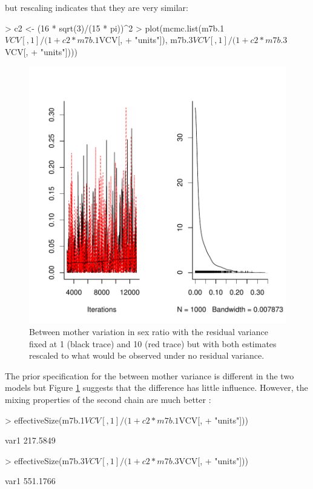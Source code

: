 \documentclass{article}
\begin{document}
but rescaling indicates that they are very similar: 

\begin{Schunk}
\begin{Sinput}
> c2 <- (16 * sqrt(3)/(15 * pi))^2
> plot(mcmc.list(m7b.1$VCV[, 1]/(1 + c2 * m7b.1$VCV[, 
+     "units"]), m7b.3$VCV[, 1]/(1 + c2 * m7b.3$VCV[, 
+     "units"])))
\end{Sinput}
\end{Schunk}

\begin{figure}[!h]
\begin{center}
\includegraphics{Lecture8-023}
\end{center}
\caption{Between mother variation in sex ratio with the residual variance fixed at 1 (black trace) and 10 (red trace) but with both estimates rescaled to what would be observed under no residual variance.}
\label{sexratio2}
\end{figure}


The prior specification for the between mother variance is different in the two models but Figure \ref{sexratio2} suggests that the difference has little influence. However, the mixing properties of the second chain are much better \citep{vanDyk.2001}:

\begin{Schunk}
\begin{Sinput}
> effectiveSize(m7b.1$VCV[, 1]/(1 + c2 * m7b.1$VCV[, 
+     "units"]))
\end{Sinput}
\begin{Soutput}
    var1 
217.5849 
\end{Soutput}
\begin{Sinput}
> effectiveSize(m7b.3$VCV[, 1]/(1 + c2 * m7b.3$VCV[, 
+     "units"]))
\end{Sinput}
\begin{Soutput}
    var1 
551.1766 
\end{Soutput}
\end{Schunk}
\end{document}
